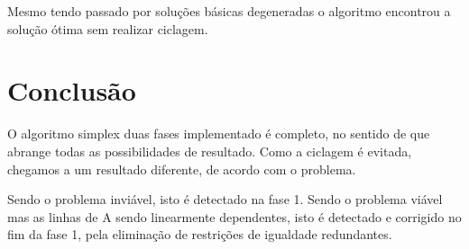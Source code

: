 \documentclass[
	12pt,				%
	openright,			%
	oneside,			%
	a4paper,			%
	english,			%
	french,				%
	spanish,			%
	brazil,				%
	]{abntex2}
\begin{document}
Mesmo tendo passado por soluções básicas degeneradas o algoritmo encontrou a solução ótima sem realizar ciclagem.



%
%
%
%

%

\chapter*[Conclusão]{Conclusão}



O algoritmo simplex duas fases implementado é completo, no sentido de que abrange todas as possibilidades de resultado. Como a ciclagem é evitada, chegamos a um resultado diferente, de acordo com o problema.

Sendo o problema inviável, isto é detectado na fase 1. Sendo o problema viável mas as linhas de A sendo linearmente dependentes, isto é detectado e corrigido no fim da fase 1, pela eliminação de restrições de igualdade redundantes.
\end{document}
